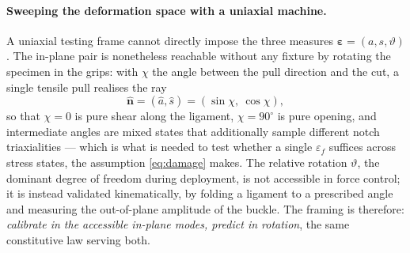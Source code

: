 \documentclass[pdflatex,sn-mathphys-num]{sn-jnl}%
\theoremstyle{thmstyleone}%
\theoremstyle{thmstyletwo}%
\theoremstyle{thmstylethree}%
\newcommand{\epsh}{\bm{\varepsilon}}
\begin{document}
\paragraph{Sweeping the deformation space with a uniaxial machine.}
A uniaxial testing frame cannot directly impose the three measures
$\epsh=(a,s,\vartheta)$. The in-plane pair is nonetheless reachable without any
fixture by rotating the specimen in the grips: with $\chi$ the angle between the
pull direction and the cut, a single tensile pull realises the ray
\begin{equation}
  \hat{\bm{n}}=(\hat a,\hat s)=(\sin\chi,\ \cos\chi),
\end{equation}
so that $\chi=0$ is pure shear along the ligament, $\chi=90^\circ$ is pure
opening, and intermediate angles are mixed states that additionally sample
different notch triaxialities --- which is what is needed to test whether a single
$\varepsilon_f$ suffices across stress states, the assumption \eqref{eq:damage} makes. The
relative rotation $\vartheta$, the dominant degree of freedom during deployment,
is not accessible in force control; it is instead validated kinematically, by
folding a ligament to a prescribed angle and measuring the out-of-plane amplitude
of the buckle. The framing is therefore: \emph{calibrate in the accessible
in-plane modes, predict in rotation}, the same constitutive law serving both.
\end{document}
